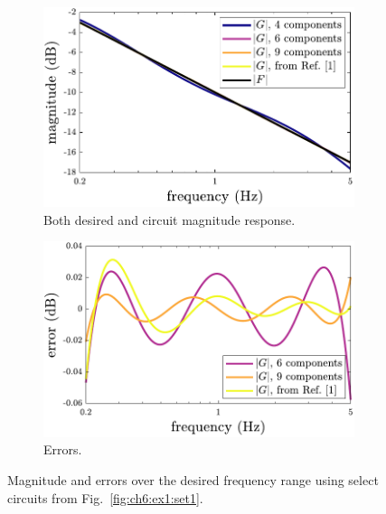 \begin{figure}
\centering
\begin{subfigure}[t]{0.5\textwidth}
\centering
\includegraphics[width=\textwidth]{../ch6/figures/reduced/r_mm1_magnitude}
\caption{Both desired and circuit magnitude response.\label{fig:mm1_magnitude}}
\end{subfigure}%
\begin{subfigure}[t]{0.5\textwidth}
\centering
\includegraphics[width=\textwidth]{../ch6/figures/reduced/r_mm1_errors}
\caption{Errors.\label{fig:mm1_errors}}
\end{subfigure}%

\caption[Magnitude and errors over the desired frequency range using select circuits.]{Magnitude and errors over the desired frequency range using select circuits from Fig.~\ref{fig:ch6:ex1:set1}.\label{fig:mm1_magerrors}}

\end{figure}